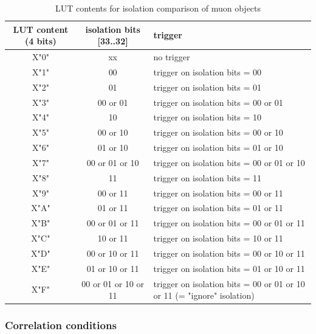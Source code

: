 \begin{table}[htdp]
\begin{center}
\begin{tabular}{|c|c|p{}|}\hline
LUT content (4 bits) & isolation bits [33..32] & trigger \\\hline\hline
X"0" & xx & no trigger\\\hline
X"1" & 00 & trigger on isolation bits = 00\\\hline
X"2" & 01 & trigger on isolation bits = 01\\\hline
X"3" & 00 or 01 & trigger on isolation bits = 00 or 01\\\hline
X"4" & 10 & trigger on isolation bits = 10\\\hline
X"5" & 00 or 10 & trigger on isolation bits = 00 or 10\\\hline
X"6" & 01 or 10 & trigger on isolation bits = 01 or 10\\\hline
X"7" & 00 or 01 or 10 & trigger on isolation bits = 00 or 01 or 10\\\hline
X"8" & 11 & trigger on isolation bits = 11\\\hline
X"9" & 00 or 11 & trigger on isolation bits = 00 or 11\\\hline
X"A" & 01 or 11 & trigger on isolation bits = 01 or 11\\\hline
X"B" & 00 or 01 or 11 & trigger on isolation bits = 00 or 01 or 11\\\hline
X"C" & 10 or 11 & trigger on isolation bits = 10 or 11\\\hline
X"D" & 00 or 10 or 11 & trigger on isolation bits = 00 or 10 or 11\\\hline
X"E" & 01 or 10 or 11 & trigger on isolation bits = 01 or 10 or 11\\\hline
X"F" & 00 or 01 or 10 or 11 & trigger on isolation bits = 00 or 01 or 10 or 11 (= "ignore" isolation)\\\hline
\end{tabular}
\end{center}
\caption{LUT contents for isolation comparison of muon objects}
\label{tab:gtl:muon_lut_iso}
\end{table}

\clearpage

\subsubsection{Correlation conditions}
\label{sec:gtl:correlation_conditions}

